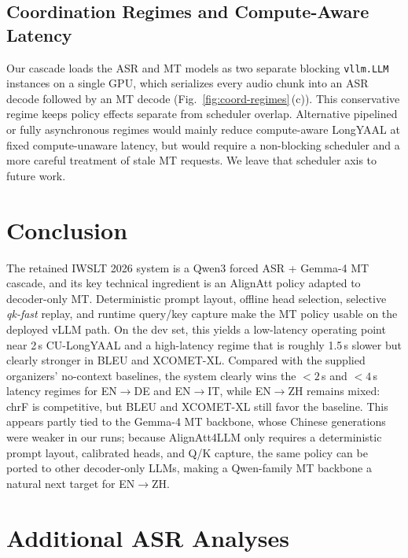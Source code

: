 \documentclass[11pt]{article}
\def\AAName{AlignAtt4LLM}
\begin{document}


\subsection{Coordination Regimes and Compute-Aware Latency}

Our cascade loads the ASR and MT models as two separate blocking
\texttt{vllm.LLM} instances on a single GPU, which serializes every audio chunk
into an ASR decode followed by an MT decode
(Fig.~\ref{fig:coord-regimes}\,(c)). This conservative regime keeps policy
effects separate from scheduler overlap. Alternative pipelined or fully
asynchronous regimes would mainly reduce compute-aware LongYAAL at fixed
compute-unaware latency, but would require a non-blocking scheduler and a more
careful treatment of stale MT requests. We leave that scheduler axis to future
work.

\section{Conclusion}
\label{sec:conclusion}

The retained IWSLT 2026 system is a Qwen3 forced ASR + Gemma-4 MT cascade, and
its key technical ingredient is an AlignAtt policy adapted to decoder-only MT.
Deterministic prompt layout, offline head selection, selective \emph{qk-fast}
replay, and runtime query/key capture make the MT policy usable on the deployed
vLLM path. On the
dev set, this yields a low-latency operating point near 2\,s CU-LongYAAL and a
high-latency regime that is roughly 1.5\,s slower but clearly stronger in
BLEU and XCOMET-XL. Compared with the supplied organizers' no-context
baselines, the system clearly wins the $<2$\,s and $<4$\,s latency regimes for
EN$\to$DE and EN$\to$IT, while EN$\to$ZH remains mixed: chrF is competitive, but
BLEU and XCOMET-XL still favor the baseline. This appears partly tied to the Gemma-4 MT backbone,
whose Chinese generations were weaker in our runs; because \AAName{} only
requires a deterministic prompt layout, calibrated heads, and Q/K capture, the
same policy can be ported to other decoder-only LLMs, making a Qwen-family MT
backbone a natural next target for EN$\to$ZH.



\appendix

\section{Additional ASR Analyses}
\label{app:appendix-asr}
\end{document}

